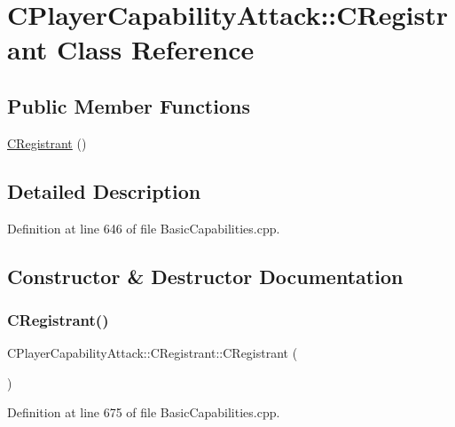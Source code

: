 \hypertarget{classCPlayerCapabilityAttack_1_1CRegistrant}{}\section{C\+Player\+Capability\+Attack\+:\+:C\+Registrant Class Reference}
\label{classCPlayerCapabilityAttack_1_1CRegistrant}
\subsection*{Public Member Functions}
\begin{DoxyCompactItemize}
\item 
\hyperlink{classCPlayerCapabilityAttack_1_1CRegistrant_afe5887c5ba5ae7d0b65e4820d6f9143e}{C\+Registrant} ()
\end{DoxyCompactItemize}


\subsection{Detailed Description}


Definition at line 646 of file Basic\+Capabilities.\+cpp.



\subsection{Constructor \& Destructor Documentation}
\hypertarget{classCPlayerCapabilityAttack_1_1CRegistrant_afe5887c5ba5ae7d0b65e4820d6f9143e}{}\label{classCPlayerCapabilityAttack_1_1CRegistrant_afe5887c5ba5ae7d0b65e4820d6f9143e} 
\subsubsection{\texorpdfstring{C\+Registrant()}{CRegistrant()}}
{\footnotesize\ttfamily C\+Player\+Capability\+Attack\+::\+C\+Registrant\+::\+C\+Registrant (\begin{DoxyParamCaption}{ }\end{DoxyParamCaption})}



Definition at line 675 of file Basic\+Capabilities.\+cpp.


